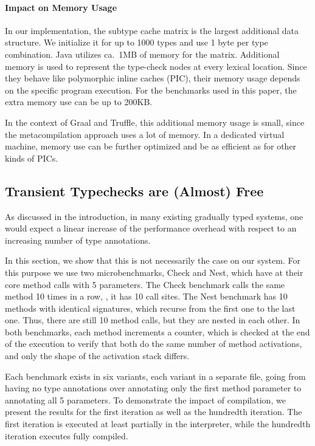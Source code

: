 \paragraph*{Impact on Memory Usage}

In our implementation, the subtype cache matrix is the largest additional
data structure.
We initialize it for up to 1000 types and use 1 byte per type combination.
Java utilizes ca.\ 1MB of memory for the matrix.
Additional memory is used to represent the type-check nodes at every lexical location.
Since they behave like polymorphic inline caches (PIC)\citep{Hoelzle:91:PIC},
their memory usage depends on the specific program execution.
For the benchmarks used in this paper, the extra memory use can be up to 200KB.

In the context of Graal and Truffle, this additional memory usage is small,
since the metacompilation approach uses a lot of memory\citep{Marr:2015:MTPE}.
In a dedicated virtual machine,
memory use can be further optimized and be as efficient as for other kinds of PICs.


\subsection{Transient Typechecks are (Almost) Free}
\label{sec:eval-best-case}

As discussed in the introduction, in many existing gradually typed systems,
one would expect a linear increase of the performance overhead
with respect to an increasing number of type annotations.

In this section, we show that this is not necessarily the case on our system.
For this purpose we use two microbenchmarks, Check and Nest,
which have at their core method calls with 5 parameters.
The Check benchmark calls the same method 10 times in a row, \ie, it has 10 call sites.
The Nest benchmark has 10 methods with identical signatures,
which recurse from the first one to the last one.
Thus, there are still 10 method calls, but they are nested in each other.
In both benchmarks, each method increments a counter,
which is checked at the end of the execution to verify that both do the same
number of method activations, and only the shape of the activation stack differs.

Each benchmark exists in six variants, each variant in a separate file,
going from having no type annotations
over annotating only the first method parameter to annotating all 5 parameters.
To demonstrate the impact of compilation,
we present the results for the first iteration as well as the hundredth iteration.
The first iteration is executed at least partially in the interpreter,
while the hundredth iteration executes fully compiled.

